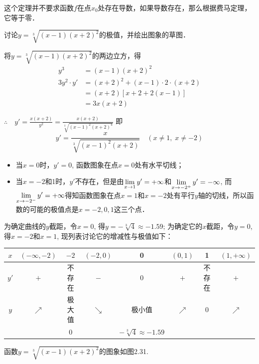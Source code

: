\begin{rmk}
    这个定理并不要求函数$f$在点$x_0$处存在导数，如果导数存在，那么根据费马定理，它等于零．
\end{rmk}


\begin{example}
    讨论$y=\sqrt[3]{(x-1)(x+2)^2}$的极值，并绘出图象的草图．
\end{example}

\begin{solution}
将$y=\sqrt[3]{(x-1)(x+2)^2}$的两边立方，得
\begin{align*}
    y^3&= (x-1) (x+2)^2\\
    3y^2\cdot y'&= (x+2)^2+ (x-1)\cdot 2\cdot  (x+2)\\
    &= (x+2) [x+2+2(x-1)]\\
    &=3x (x+2) 
\end{align*}

$\therefore\quad 
y'=\frac{x (x+2)}{y^2}=\frac{x (x+2)}{\sqrt[3]{(x-1)^2(x+2)^4}}$
即
\[y'=\frac{x}{\sqrt[3]{(x-1)^2(x+2)}}\quad 
(x\ne 1,\; x\ne -2)\]
\begin{itemize}
    \item 当$x=0$时，$y'=0$, 函数图象在点$x=0$处有水平切线；
    \item 当$x=-2$和1时，$y'$不存在，但是由$\displaystyle\lim_{x\to 1}y'=+\infty$和$\displaystyle\lim_{x\to -2^+}y'=-\infty$, 而$\displaystyle\lim_{x\to -2^-}y'=+\infty$得知函数图象在点$x=1$和$x=-2$处有平行$y$轴的切线，所以函数的可能的极值点是$x=-2, 0, 1$这三个点．
\end{itemize}

为确定曲线的$y$截距，令$x=0$, 得$y=-\sqrt[3]{4}\approx -1.59$; 为确定它的$x$截距，令$y=0$, 得$x=-2$和$x=1$, 现列表讨论它的增减性与极值如下：
\begin{center}
\begin{tabular}{c|ccccccc}
\hline
$x$ &$(-\infty,-2)$ & $-2$ & $(-2,0)$ & 0&$(0,1)$& 1& $(1,+\infty)$\\
\hline
$y'$ & $+$ & 不存在 & $-$ &0&$+$&不存在&$+$\\
$y$ & $\nearrow$ &极大值&$\searrow$ &极小值&$\nearrow$ &0&$\nearrow$\\ 
&&0&&$-\sqrt[3]{4}\approx -1.59$\\
\hline
\end{tabular}
\end{center}

函数$y=\sqrt[3]{(x-1)(x+2)^2}$的图象如图2.31.
\begin{figure}[htp]
    \centering
{}
\end{figure}
\end{solution}

